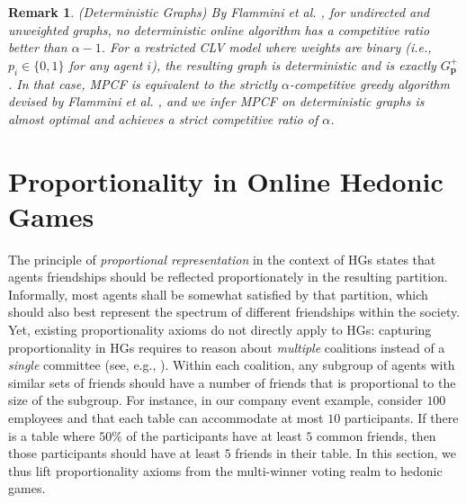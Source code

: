 \documentclass[letterpaper]{article}
\newtheorem{remark}{Remark}
\begin{document}
\begin{remark}
\label{remark:competitive analysis}
{\normalfont (Deterministic Graphs)}
By Flammini et al. , for undirected and unweighted graphs, no deterministic online algorithm has a competitive ratio better than $\alpha-1$. For a restricted CLV model where weights are binary (i.e., $p_i \in \{0,1\}$ for any agent $i$), the resulting graph is deterministic and is exactly $G^+_{\mathbf{p}}$. In that case, MPCF is equivalent to the strictly $\alpha$-competitive greedy algorithm devised by Flammini et al. , and we infer MPCF on deterministic graphs is almost optimal and achieves a strict competitive ratio of $\alpha$.
\end{remark}































\section{Proportionality in Online Hedonic Games}
\label{sec:Proportionality Axioms in OASHGs}
The principle of \textit{proportional representation} in the context of HGs states that agents friendships should be reflected proportionately in the resulting partition. Informally, most agents shall be somewhat satisfied by that partition, which should also best represent the spectrum of different friendships within the society. Yet, existing proportionality axioms do not directly apply to HGs: capturing proportionality in HGs requires to reason about \textit{multiple} coalitions instead of a \textit{single} committee (see, e.g., \cite{aziz2017justified}). Within each coalition, any subgroup of agents with similar sets of friends should have a number of friends that is proportional to the size of the subgroup. For instance, in our company event example, consider $100$ employees and that each table can accommodate at most $10$ participants. If there is a table where $50\%$ of the participants have at least $5$ common friends, then those participants should have at least $5$ friends in their table. In this section, we thus lift proportionality axioms from the multi-winner voting realm to hedonic games.
\end{document}
